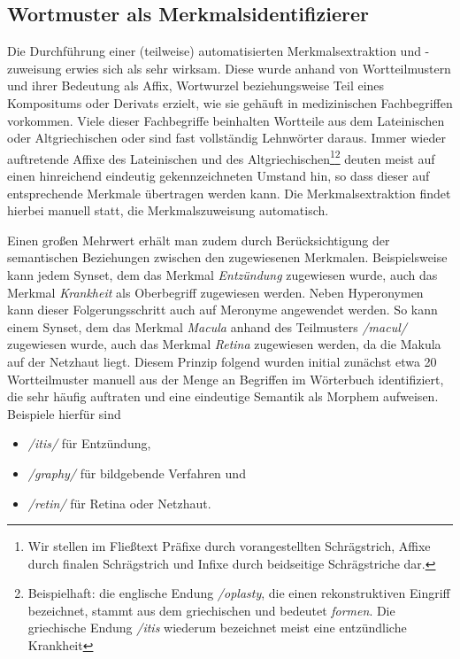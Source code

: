 \documentclass[pagesize,paper=A4,DIV=calc,fontsize=12pt,draft=false]{scrreprt}
\begin{document}
\subsection{Wortmuster als Merkmalsidentifizierer}

Die Durchführung einer (teilweise) automatisierten Merkmalsextraktion und -zuweisung erwies sich als sehr wirksam. 
Diese wurde anhand von Wortteilmustern und ihrer Bedeutung als Affix, Wortwurzel beziehungsweise Teil eines Kompositums oder Derivats erzielt, wie sie gehäuft in medizinischen Fachbegriffen vorkommen. 
Viele dieser Fachbegriffe beinhalten Wortteile aus dem Lateinischen oder Altgriechischen oder sind fast vollständig Lehnwörter daraus. 
Immer wieder auftretende Affixe des Lateinischen und des Altgriechischen\footnote{Wir stellen im Fließtext Präfixe durch vorangestellten Schrägstrich, Affixe durch finalen Schrägstrich und Infixe durch beidseitige Schrägstriche dar.}\footnote{Beispielhaft: die englische Endung \emph{/oplasty}, die einen rekonstruktiven Eingriff bezeichnet, stammt aus dem griechischen und bedeutet \emph{formen}. 
Die griechische Endung \emph{/itis} wiederum bezeichnet meist eine entzündliche Krankheit} deuten meist auf einen hinreichend eindeutig gekennzeichneten Umstand hin, so dass dieser auf entsprechende Merkmale übertragen werden kann. 
Die Merkmalsextraktion findet hierbei manuell statt, die Merkmalszuweisung automatisch. 

Einen großen Mehrwert erhält man zudem durch Berücksichtigung der semantischen Beziehungen zwischen den zugewiesenen Merkmalen. 
Beispielsweise kann jedem Synset, dem das Merkmal \textit{Entzündung} zugewiesen wurde, auch das Merkmal \textit{Krankheit} als Oberbegriff zugewiesen werden. 
Neben Hyperonymen kann dieser Folgerungsschritt auch auf Meronyme angewendet werden. 
So kann einem Synset, dem das Merkmal \textit{Macula} anhand des Teilmusters \emph{/macul/} zugewiesen wurde, auch das Merkmal \textit{Retina} zugewiesen werden, da die Makula auf der Netzhaut liegt. 
Diesem Prinzip folgend wurden initial zunächst etwa 20 Wortteilmuster manuell aus der Menge an Begriffen im Wörterbuch identifiziert, die sehr häufig auftraten und eine eindeutige Semantik als Morphem aufweisen. 
Beispiele hierfür sind 

\begin{itemize}
\item
 \emph{/itis/} für Entzündung,
\item
 \emph{/graphy/} für bildgebende Verfahren und
\item
 \emph{/retin/} für Retina oder Netzhaut.
\end{itemize}
\end{document}
